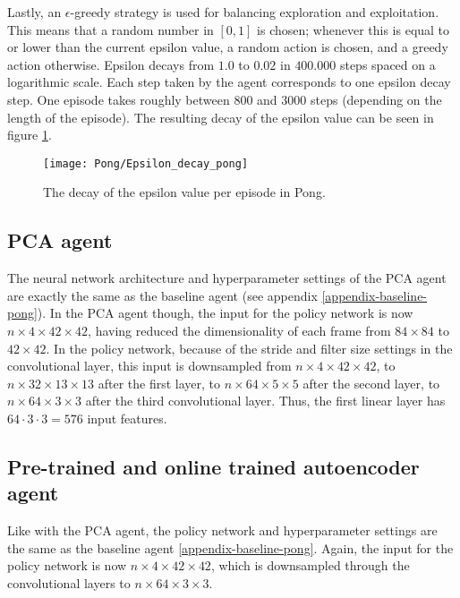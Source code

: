 Lastly, an $\epsilon$-greedy strategy is used for balancing exploration and exploitation. This means that a random number in $[0,1]$ is chosen; whenever this is equal to or lower than the current epsilon value, a random action is chosen, and a greedy action otherwise. Epsilon decays from $1.0$ to $0.02$ in $400.000$ steps spaced on a logarithmic scale. Each step taken by the agent corresponds to one epsilon decay step. One episode takes roughly between $800$ and $3000$ steps (depending on the length of the episode). The resulting decay of the epsilon value can be seen in figure \ref{fig:epsilon}.

\begin{figure}[h]
    \centering
    \texttt{[image: Pong/Epsilon\_decay\_pong]}
    \caption{The decay of the epsilon value per episode in Pong.}
    \label{fig:epsilon}
\end{figure}

\subsection{PCA agent}
The neural network architecture and hyperparameter settings of the PCA agent are exactly the same as the baseline agent (see appendix \ref{appendix-baseline-pong}). In the PCA agent though, the input for the policy network is now $n \times 4 \times 42 \times 42$, having reduced the dimensionality of each frame from $84 \times 84$ to $42 \times 42$. In the policy network, because of the stride and filter size settings in the convolutional layer, this input is downsampled from $n \times 4 \times 42 \times 42$, to $n \times 32 \times 13 \times 13$ after the first layer, to $n \times 64 \times 5 \times 5$ after the second layer, to $n \times 64 \times 3 \times 3$ after the third convolutional layer. Thus, the first linear layer has $64 \cdot 3 \cdot 3 = 576$ input features.


\subsection{Pre-trained and online trained autoencoder agent} %
Like with the PCA agent, the policy network and hyperparameter settings are the same as the baseline agent \ref{appendix-baseline-pong}. Again, the input for the policy network is now $n \times 4 \times 42 \times 42$, which is downsampled through the convolutional layers to $n \times 64 \times 3 \times 3$. \newline

